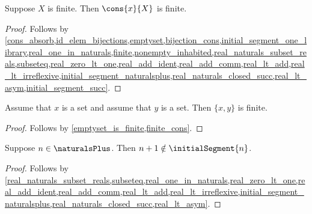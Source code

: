 \begin{lemma}\label{finite_cons}
    Suppose $X$ is finite.
    Then $\cons{x}{X}$ is finite.
\end{lemma}
\begin{proof}
    Follows by \cref{cons_absorb,id_elem_bijections,emptyset,bijection_cons,initial_segment_one_library,real_one_in_naturals,finite,nonempty_inhabited,real_naturals_subset_reals,subseteq,real_zero_lt_one,real_add_ident,real_add_comm,real_lt_add,real_lt_irreflexive,initial_segment_naturalsplus,real_naturals_closed_succ,real_lt_asym,initial_segment_succ}.
\end{proof}

\begin{lemma} \label{pair_is_finite}
    Assume that $x$ is a set and assume that $y$ is a set.
    Then $\{x,y\}$ is finite.
\end{lemma}
\begin{proof}
    Follows by \cref{emptyset_is_finite,finite_cons}.
\end{proof}

\begin{lemma}\label{initial_segment_last_fresh}
    Suppose $n\in\naturalsPlus$.
    Then $n+1\notin\initialSegment{n}$.
\end{lemma}
\begin{proof}
    Follows by \cref{real_naturals_subset_reals,subseteq,real_one_in_naturals,real_zero_lt_one,real_add_ident,real_add_comm,real_lt_add,real_lt_irreflexive,initial_segment_naturalsplus,real_naturals_closed_succ,real_lt_asym}.
\end{proof}


